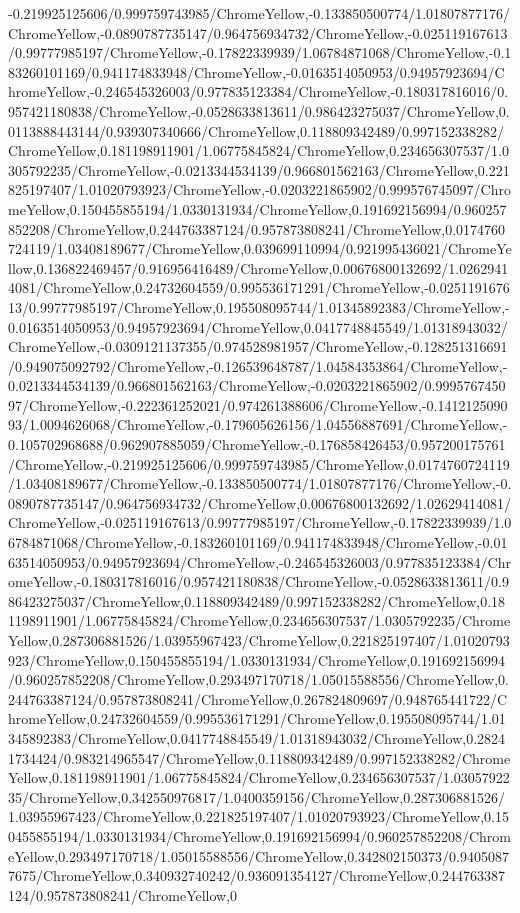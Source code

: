{\begin{tikzternal}
{-0.219925125606/0.999759743985/ChromeYellow,-0.133850500774/1.01807877176/ChromeYellow,-0.0890787735147/0.964756934732/ChromeYellow,-0.025119167613/0.99777985197/ChromeYellow,-0.17822339939/1.06784871068/ChromeYellow,-0.183260101169/0.941174833948/ChromeYellow,-0.0163514050953/0.94957923694/ChromeYellow,-0.246545326003/0.977835123384/ChromeYellow,-0.180317816016/0.957421180838/ChromeYellow,-0.0528633813611/0.986423275037/ChromeYellow,0.0113888443144/0.939307340666/ChromeYellow,0.118809342489/0.997152338282/ChromeYellow,0.181198911901/1.06775845824/ChromeYellow,0.234656307537/1.0305792235/ChromeYellow,-0.0213344534139/0.966801562163/ChromeYellow,0.221825197407/1.01020793923/ChromeYellow,-0.0203221865902/0.999576745097/ChromeYellow,0.150455855194/1.0330131934/ChromeYellow,0.191692156994/0.960257852208/ChromeYellow,0.244763387124/0.957873808241/ChromeYellow,0.0174760724119/1.03408189677/ChromeYellow,0.039699110994/0.921995436021/ChromeYellow,0.136822469457/0.916956416489/ChromeYellow,0.00676800132692/1.02629414081/ChromeYellow,0.24732604559/0.995536171291/ChromeYellow,-0.025119167613/0.99777985197/ChromeYellow,0.195508095744/1.01345892383/ChromeYellow,-0.0163514050953/0.94957923694/ChromeYellow,0.0417748845549/1.01318943032/ChromeYellow,-0.0309121137355/0.974528981957/ChromeYellow,-0.128251316691/0.949075092792/ChromeYellow,-0.126539648787/1.04584353864/ChromeYellow,-0.0213344534139/0.966801562163/ChromeYellow,-0.0203221865902/0.999576745097/ChromeYellow,-0.222361252021/0.974261388606/ChromeYellow,-0.141212509093/1.0094626068/ChromeYellow,-0.179605626156/1.04556887691/ChromeYellow,-0.105702968688/0.962907885059/ChromeYellow,-0.176858426453/0.957200175761/ChromeYellow,-0.219925125606/0.999759743985/ChromeYellow,0.0174760724119/1.03408189677/ChromeYellow,-0.133850500774/1.01807877176/ChromeYellow,-0.0890787735147/0.964756934732/ChromeYellow,0.00676800132692/1.02629414081/ChromeYellow,-0.025119167613/0.99777985197/ChromeYellow,-0.17822339939/1.06784871068/ChromeYellow,-0.183260101169/0.941174833948/ChromeYellow,-0.0163514050953/0.94957923694/ChromeYellow,-0.246545326003/0.977835123384/ChromeYellow,-0.180317816016/0.957421180838/ChromeYellow,-0.0528633813611/0.986423275037/ChromeYellow,0.118809342489/0.997152338282/ChromeYellow,0.181198911901/1.06775845824/ChromeYellow,0.234656307537/1.0305792235/ChromeYellow,0.287306881526/1.03955967423/ChromeYellow,0.221825197407/1.01020793923/ChromeYellow,0.150455855194/1.0330131934/ChromeYellow,0.191692156994/0.960257852208/ChromeYellow,0.293497170718/1.05015588556/ChromeYellow,0.244763387124/0.957873808241/ChromeYellow,0.267824809697/0.948765441722/ChromeYellow,0.24732604559/0.995536171291/ChromeYellow,0.195508095744/1.01345892383/ChromeYellow,0.0417748845549/1.01318943032/ChromeYellow,0.28241734424/0.983214965547/ChromeYellow,0.118809342489/0.997152338282/ChromeYellow,0.181198911901/1.06775845824/ChromeYellow,0.234656307537/1.0305792235/ChromeYellow,0.342550976817/1.0400359156/ChromeYellow,0.287306881526/1.03955967423/ChromeYellow,0.221825197407/1.01020793923/ChromeYellow,0.150455855194/1.0330131934/ChromeYellow,0.191692156994/0.960257852208/ChromeYellow,0.293497170718/1.05015588556/ChromeYellow,0.342802150373/0.94050877675/ChromeYellow,0.340932740242/0.936091354127/ChromeYellow,0.244763387124/0.957873808241/ChromeYellow,0}
\end{tikzternal}}
